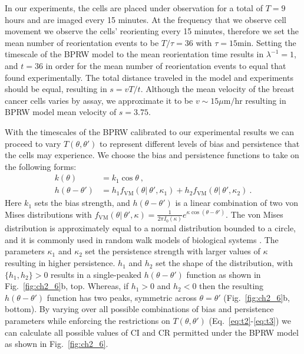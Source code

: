 In our experiments, the cells are placed under observation for a total of $T = 9$ hours and are imaged every 15 minutes. At the frequency that we observe cell movement we observe the cells' reorienting every 15 minutes, therefore we set the mean number of reorientation events to be
$T/\tau = 36$ with $\tau = 15 \text{min}$.
Setting the timescale of the BPRW model to the mean reorientation time results in $\lambda^{-1} = 1$, and $t = 36$ in order for the mean number of reorientation events to equal that found experimentally. The total distance traveled in the model and experiments should be equal, resulting in $s = vT/t$. Although the mean velocity of the breast cancer cells varies by assay, we approximate it to be $v \sim 15 \mu\text{m/hr}$ resulting in BPRW model mean velocity of $s = 3.75$.

With the timescales of the BPRW calibrated to our experimental results we can proceed to vary $T(\theta,\theta')$ to represent different levels of bias and persistence that the cells may experience. We choose the bias and persistence functions to take on the following forms:
\begin{align}
    k(\theta) &= k_1 \cos\theta \ , \\
    h(\theta-\theta') &= h_1 f_\text{VM}(\theta | \ \theta', \kappa_1) + h_2 f_\text{VM}(\theta | \ \theta', \kappa_2) \ .
\end{align}
Here $k_1$ sets the bias strength, and $h(\theta-\theta')$ is a linear combination of two von Mises distributions with
$f_\text{VM}(\theta | \ \theta', \kappa) = \frac{1}{2\pi I_0(\kappa)} e^{\kappa \cos(\theta-\theta')}$.
The von Mises distribution is approximately equal to a normal distribution bounded to a circle, and it is commonly used in random walk models of biological systems .
The parameters $\kappa_1$ and $\kappa_2$ set the persistence strength with larger values of $\kappa$ resulting in higher persistence. $h_1$ and $h_2$ set the shape of the distribution, with $\{h_1,h_2\} > 0$ results in a single-peaked $h(\theta-\theta')$ function as shown in Fig.\ \ref{fig:ch2_6}b, top. Whereas, if $h_1> 0$ and $h_2<0$ then the resulting $h(\theta-\theta')$ function has two peaks, symmetric across $\theta=\theta'$ (Fig.\ \ref{fig:ch2_6}b, bottom).
By varying over all possible combinations of bias and persistence parameters while enforcing the restrictions on $T(\theta,\theta')$ (Eq.\ \ref{eq:t2}-\ref{eq:t3}) we can calculate all possible values of CI and CR permitted under the BPRW model as shown in Fig.\ \ref{fig:ch2_6}.

